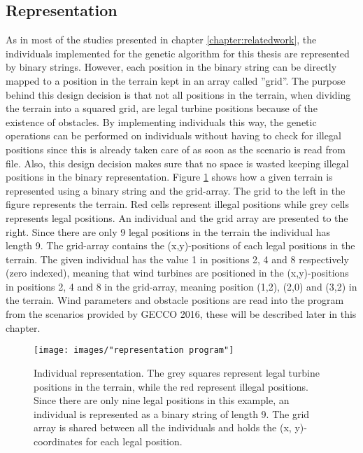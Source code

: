 \subsection{Representation}
As in most of the studies presented in chapter \ref{chapter:relatedwork}, the individuals implemented for the genetic algorithm for this thesis are represented by binary strings. However, each position in the binary string can be directly mapped to a position in the terrain kept in an array called ''grid''. The purpose behind this design decision is that not all positions in the terrain, when dividing the terrain into a squared grid, are legal turbine positions because of the existence of obstacles. By implementing individuals this way, the genetic operations can be performed on individuals without having to check for illegal positions since this is already taken care of as soon as the scenario is read from file. Also, this design decision makes sure that no space is wasted keeping illegal positions in the binary representation. Figure \ref{figure:representation} shows how a given terrain is represented using a binary string and the grid-array. The grid to the left in the figure represents the terrain. Red cells represent illegal positions while grey cells represents legal positions. An individual and the grid array are presented to the right. Since there are only 9 legal positions in the terrain the individual has length 9. The grid-array contains the (x,y)-positions of each legal positions in the terrain. The given individual has the value 1 in positions 2, 4 and 8 respectively (zero indexed), meaning that wind turbines are positioned in the (x,y)-positions in positions 2, 4 and 8 in the grid-array, meaning position (1,2), (2,0) and (3,2) in the terrain. Wind parameters and obstacle positions are read into the program from the scenarios provided by GECCO 2016, these will be described later in this chapter.


\begin{figure}[h!]
\begin{center}
\texttt{[image: images/"representation program"]}
\caption{Individual representation. The grey squares represent legal turbine positions in the terrain, while the red represent illegal positions. Since there are only nine legal positions in this example, an individual is represented as a binary string of length 9. The grid array is shared between all the individuals and holds the (x, y)-coordinates for each legal position.}
\label{figure:representation}
\end{center}
\end{figure}



